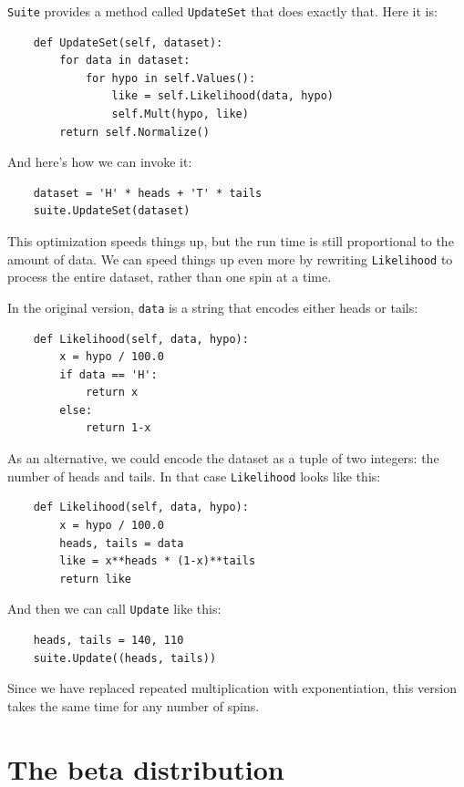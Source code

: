 \documentclass[12pt]{book}
\begin{document}
\verb"Suite" provides a method called \verb"UpdateSet" that does
exactly that.  Here it is:

\begin{verbatim}
    def UpdateSet(self, dataset):
        for data in dataset:
            for hypo in self.Values():
                like = self.Likelihood(data, hypo)
                self.Mult(hypo, like)
        return self.Normalize()
\end{verbatim}

And here's how we can invoke it:

\begin{verbatim}
    dataset = 'H' * heads + 'T' * tails
    suite.UpdateSet(dataset)
\end{verbatim}

This optimization speeds things up, but the run time is still
proportional to the amount of data.  We can speed things up
even more by rewriting \verb"Likelihood" to process the entire
dataset, rather than one spin at a time.

In the original version,
\verb"data" is a string that encodes either heads or tails:

\begin{verbatim}
    def Likelihood(self, data, hypo):
        x = hypo / 100.0
        if data == 'H':
            return x
        else:
            return 1-x
\end{verbatim}

As an alternative, we could encode the dataset as a tuple of 
two integers: the number of heads and tails.
In that case \verb"Likelihood" looks like this:

\begin{verbatim}
    def Likelihood(self, data, hypo):
        x = hypo / 100.0
        heads, tails = data
        like = x**heads * (1-x)**tails
        return like
\end{verbatim}

And then we can call \verb"Update" like this:

\begin{verbatim}
    heads, tails = 140, 110
    suite.Update((heads, tails))
\end{verbatim}

Since we have replaced repeated multiplication with exponentiation,
this version takes the same time for any number of spins.


\section{The beta distribution}
\label{beta}
\end{document}
